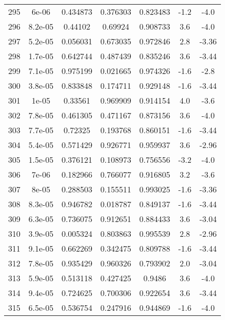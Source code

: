 \begin{table}
\begin{tabular}{c|c|c|c|c|c|c}
295 & 6e-06 & 0.434873 & 0.376303 & 0.823483 & -1.2 & -4.0\\
296 & 8.2e-05 & 0.44102 & 0.69924 & 0.908733 & 3.6 & -4.0\\
297 & 5.2e-05 & 0.056031 & 0.673035 & 0.972846 & 2.8 & -3.36\\
298 & 1.7e-05 & 0.642744 & 0.487439 & 0.835246 & 3.6 & -3.44\\
299 & 7.1e-05 & 0.975199 & 0.021665 & 0.974326 & -1.6 & -2.8\\
300 & 3.8e-05 & 0.833848 & 0.174711 & 0.929148 & -1.6 & -3.44\\
301 & 1e-05 & 0.33561 & 0.969909 & 0.914154 & 4.0 & -3.6\\
302 & 7.8e-05 & 0.461305 & 0.471167 & 0.873156 & 3.6 & -4.0\\
303 & 7.7e-05 & 0.72325 & 0.193768 & 0.860151 & -1.6 & -3.44\\
304 & 5.4e-05 & 0.571429 & 0.926771 & 0.959937 & 3.6 & -2.96\\
305 & 1.5e-05 & 0.376121 & 0.108973 & 0.756556 & -3.2 & -4.0\\
306 & 7e-06 & 0.182966 & 0.766077 & 0.916805 & 3.2 & -3.6\\
307 & 8e-05 & 0.288503 & 0.155511 & 0.993025 & -1.6 & -3.36\\
308 & 8.3e-05 & 0.946782 & 0.018787 & 0.849137 & -1.6 & -3.44\\
309 & 6.3e-05 & 0.736075 & 0.912651 & 0.884433 & 3.6 & -3.04\\
310 & 3.9e-05 & 0.005324 & 0.803863 & 0.995539 & 2.8 & -2.96\\
311 & 9.1e-05 & 0.662269 & 0.342475 & 0.809788 & -1.6 & -3.44\\
312 & 7.8e-05 & 0.935429 & 0.960326 & 0.793902 & 2.0 & -3.04\\
313 & 5.9e-05 & 0.513118 & 0.427425 & 0.9486 & 3.6 & -4.0\\
314 & 9.4e-05 & 0.724625 & 0.700306 & 0.922654 & 3.6 & -3.44\\
315 & 6.5e-05 & 0.536754 & 0.247916 & 0.944869 & -1.6 & -4.0\\
\end{tabular}
\end{table}
\newpage
